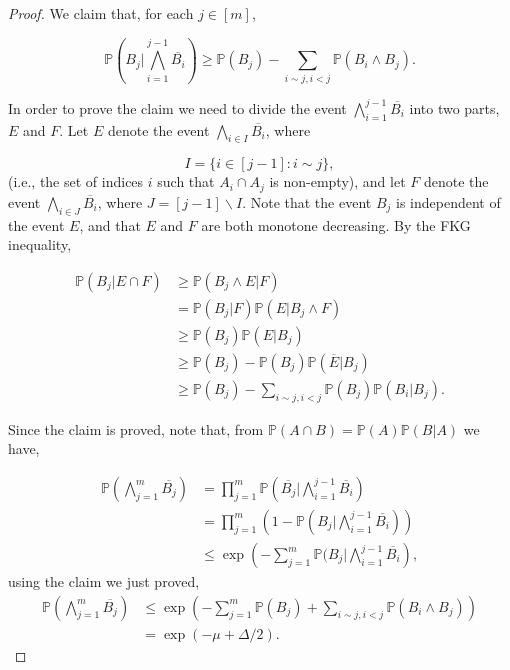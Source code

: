 \documentclass[12pt,twoside,a4paper,bibliography=totocnumbered]{book}
\numberwithin{equation}{section}
\let\backslash=\smallsetminus
\theoremstyle{remark}
\begin{document}
\begin{proof}
We claim that, for each $j \in [m]$,

$$\mathbb{P} \left( B_j | \bigwedge_{i=1}^{j-1} \overline{B_i} \right) \geq \mathbb{P}(B_j) - \sum_{i\sim j, i<j} \mathbb{P}(B_i \wedge B_j). $$

In order to prove the claim we need to divide the event $\bigwedge^{j-1}_ {i=1} \overline{B_i}$ into two parts, $E$ and $F$. Let $E$ denote the event $\bigwedge_{i \in I} \overline{B_i}$, where

$$ I = \{ i \in [j-1]: i \sim j \},$$
(i.e., the set of indices $i$ such that $A_i \cap A_j$ is non-empty), and let $F$ denote the event $\bigwedge_{i \in J} \overline{B_i}$, where $J=[j-1]\backslash I$. Note that the event $B_j$ is independent of the event $E$, and that $E$ and $F$ are both monotone decreasing. By the FKG inequality,

\begin{align*}
\mathbb{P}(B_j | E \cap F) & \geq \mathbb{P}(B_j \wedge E | F)\\
& = \mathbb{P}(B_j | F) \mathbb{P}(E | B_j \wedge F)\\
& \geq \mathbb{P}(B_j)\mathbb{P}(E|B_j)\\
& \geq \mathbb{P}(B_j) - \mathbb{P}(B_j) \mathbb{P}(\overline{E} | B_j)\\
& \geq \mathbb{P}(B_j) - \sum_{i \sim j, i < j}\mathbb{P}(B_j) \mathbb{P}(B_i | B_j).
\end{align*}

Since the claim is proved, note that, from $\mathbb{P}(A\cap B) = \mathbb{P}(A)\mathbb{P}(B|A)$ we have,

\begin{align*}
\mathbb{P}\left( \bigwedge_{j=1}^m \overline{B_j} \right) &= \prod_{j=1}^m \mathbb{P}\left( \overline{B_j} | \bigwedge_{i = 1}^{j-1} \overline{B_i}\right)\\
& = \prod_{j=1}^m \left( 1 - \mathbb{P}\left(B_j | \bigwedge_{i = 1}^{j-1} \overline{B_i}\right)\right)\\
& \leq \exp\left(- \sum_{j=1}^m \mathbb{P}(B_j | \bigwedge_{i=1}^{j-1} \overline{B_i}\right),
\end{align*}
using the claim we just proved,
\begin{align*}
\mathbb{P}\left( \bigwedge_{j=1}^m \overline{B_j} \right) &\leq  \exp\left(- \sum_{j=1}^m \mathbb{P}(B_j) + \sum_{i \sim j, i< j} \mathbb{P}(B_i \wedge B_j)\right)\\
& = \exp( - \mu + \Delta /2).
\end{align*}


\end{proof}
\end{document}
